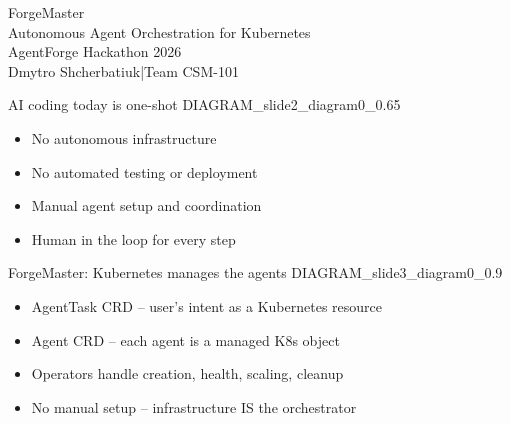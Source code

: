 \documentclass[aspectratio=169,14pt]{beamer}
\begin{document}
{
\begin{frame}[plain]
\vfill
\begin{center}
{ForgeMaster}\\[12pt]
{Autonomous Agent Orchestration for Kubernetes}\\[60pt]
{\small\color{muted}AgentForge Hackathon 2026}\\[4pt]
{\small\color{muted}Dmytro Shcherbatiuk\enspace|\enspace Team CSM-101}
\end{center}
\vfill
\end{frame}
}

\begin{frame}{AI coding today is one-shot}
{{DIAGRAM_slide2_diagram0_0.65}}
\begin{itemize}
  \item No autonomous infrastructure
  \item No automated testing or deployment
  \item Manual agent setup and coordination
  \item Human in the loop for every step
\end{itemize}
\end{frame}

\begin{frame}{ForgeMaster: Kubernetes manages the agents}
{{DIAGRAM_slide3_diagram0_0.9}}
\begin{itemize}
  \item \textcolor{accent}{AgentTask CRD} -- user's intent as a Kubernetes resource
  \item \textcolor{accent}{Agent CRD} -- each agent is a managed K8s object
  \item Operators handle creation, health, scaling, cleanup
  \item No manual setup -- infrastructure IS the orchestrator
\end{itemize}
\end{frame}
\end{document}
